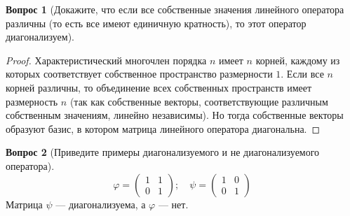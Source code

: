 \documentclass[a4paper,11pt]{article}
\theoremstyle{remark}
\theoremstyle{definition}
\newtheorem{question}{Вопрос}
\numberwithin{question}{subsection}
\begin{document}
\begin{question}[Докажите, что если все собственные значения линейного оператора различны (то есть все имеют единичную кратность), то этот оператор диагонализуем]\(\)
\begin{proof}
Характеристический многочлен порядка \(n\) имеет \(n\) корней, каждому из которых соответствует собственное пространство размерности \(1\). Если все \(n\) корней различны, то объединение всех собственных пространств имеет размерность \(n\) (так как собственные векторы, соответствующие различным собственным значениям, линейно независимы). Но тогда собственные векторы образуют базис, в котором матрица линейного оператора диагональна.
\end{proof}
\end{question}

\begin{question}[Приведите примеры диагонализуемого и не диагонализуемого оператора]
\begin{equation*}
	\varphi = 
	\begin{pmatrix}
		1 & 1 \\
		0 & 1
	\end{pmatrix};\quad
	\psi = 
	\begin{pmatrix}
		1 & 0 \\
		0 & 1
	\end{pmatrix}
\end{equation*}
Матрица \(\psi\) --- диагонализуема, а \(\varphi\) --- нет. 
\end{question}
\end{document}
